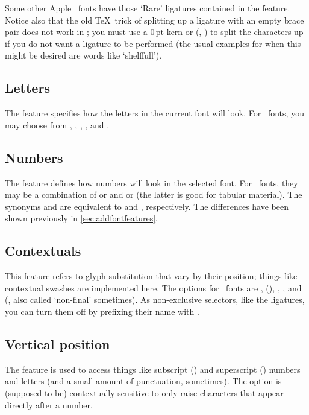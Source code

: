 \documentclass[a4paper]{l3doc}
\begin{document}
Some other Apple \AAT\ fonts have those `Rare' ligatures contained in
the  feature. Notice also that the old \TeX\ trick of
splitting up a ligature with an empty brace pair does not work in
\XeTeX; you must use a 0\,pt kern or  (\eg, ) to
split the characters up if you do not want a ligature to be performed (the usual examples for when this might be desired are words like `shelf\null full').

\subsection{Letters} \label{sec:aat-letters}
The  feature specifies how the letters in the current font
will look. For \AAT\ fonts, you may choose from ,
, , , and
.


\subsection{Numbers}
The  feature defines how numbers will look in the
selected font. For \AAT\ fonts, they may be a
combination of  or  and  or
 (the latter is good for tabular material). The synonyms
 and  are equivalent to  and
, respectively. The differences have been shown previously
in \vref{sec:addfontfeatures}.

\subsection{Contextuals} \label{sec:contextuals}
This feature refers to glyph substitution that vary by their position;
things like contextual swashes are implemented here.
The options for \AAT\ fonts are
,  (), ,
, and  (, also called `non-final' sometimes). As
non-exclusive selectors, like the ligatures, you can turn them off
by prefixing their name with .

\subsection{Vertical position}
The  feature is used to access things like
subscript () and superscript () numbers and
letters (and a small amount of punctuation, sometimes).
The  option is (supposed to be)
contextually sensitive to only raise characters that appear directly
after a number.
\end{document}
